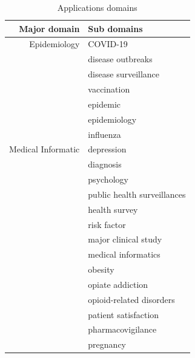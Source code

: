 \begin{center}
    \begin{longtable}{ rl }
        \caption{Applications domains}                            \\
        Major domain            & Sub domains                     \\
        \bottomrule
        Epidemiology            & COVID-19                        \\
                                & disease outbreaks               \\
                                & disease surveillance            \\
                                & vaccination                     \\
                                & epidemic                        \\
                                & epidemiology                    \\
                                & influenza                       \\
        Medical Informatic      & depression                      \\
                                & diagnosis                       \\
                                & psychology                      \\
                                & public health surveillances     \\
                                & health survey                   \\
                                & risk factor                     \\
                                & major clinical study            \\
                                & medical informatics             \\
                                & obesity                         \\
                                & opiate addiction                \\
                                & opioid-related disorders        \\
                                & patient satisfaction            \\
                                & pharmacovigilance               \\
                                & pregnancy                       \\

\end{longtable}
\end{center}
